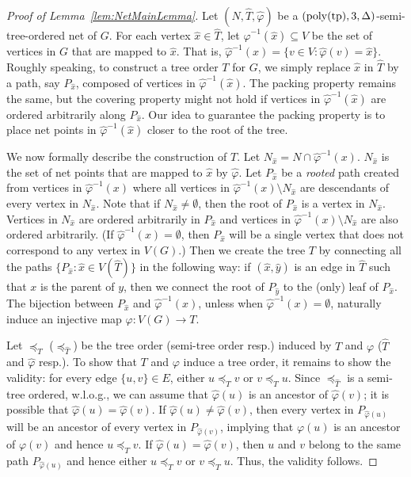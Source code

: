 \documentclass{article}
\newcommand{\tp}{{\rm tp}}
\newcommand{\poly}{\mathrm{poly}}
\begin{document}
\begin{proof}[Proof of Lemma~\ref{lem:NetMainLemma}] Let $(N,\hat{T},\hat{\varphi})$ be a $(\poly(\tp),3,\Delta)$-semi-tree-ordered net of $G$. For each vertex $\hat{x}\in \hat{T}$, let $\hat{\varphi}^{-1}(\hat{x})\subseteq V$ be the set of vertices in $G$ that are mapped to $\hat{x}$.  That is,  $\hat{\varphi}^{-1}(x) = \{v\in V: \hat{\varphi}(v) = \hat{x}\}$. Roughly speaking, to construct a tree order $T$ for $G$,  we simply replace $\hat{x}$ in $\hat{T}$ by a path, say $P_{\hat{x}}$, composed of vertices in  $\hat{\varphi}^{-1}(\hat{x})$. The packing property remains the same, but the covering property might not hold if vertices in  $\hat{\varphi}^{-1}(\hat{x})$ are ordered arbitrarily along $P_{\hat{x}}$. Our idea to guarantee the packing property is to place net points in $\hat{\varphi}^{-1}(\hat{x})$ closer to the root of the tree.


We now formally describe the construction of $T$. Let $N_{\hat{x}} = N\cap \hat{\varphi}^{-1}(x)$. $N_{\hat{x}}$ is the set of net points that are mapped to $\hat{x}$ by $\hat{\varphi}$. Let $P_{\hat{x}}$ be a \emph{rooted} path created from vertices in $\hat{\varphi}^{-1}(x)$ where all vertices in   $\hat{\varphi}^{-1}(x)\setminus N_{\hat{x}}$ are descendants of every vertex in $N_{\hat{x}}$. Note that if $N_{\hat{x}}\not=\emptyset$, then the root of $P_{\hat{x}}$ is a vertex in $N_{\hat{x}}$. Vertices in $N_{\hat{x}}$ are ordered arbitrarily in  $P_{\hat{x}}$ and vertices in $\hat{\varphi}^{-1}(x)\setminus N_{\hat{x}}$ are also ordered arbitrarily. (If $\hat{\varphi}^{-1}(x) = \emptyset$, then $P_{\hat{x}}$ will be a single vertex that does not correspond to any vertex in $V(G)$.) Then we create the tree $T$ by connecting all the paths $\{P_{\hat{x}}: \hat{x} \in V(\hat{T})\}$ in the following way: if $(\hat{x},\hat{y})$ is an edge in $\hat{T}$ such that $x$ is the parent of $y$, then we connect the root of $P_{\hat{y}}$ to the (only) leaf of $P_{\hat{x}}$. The bijection between $P_{\hat{x}}$ and $\hat{\varphi}^{-1}(x)$, unless when $\hat{\varphi}^{-1}(x) = \emptyset$, naturally induce an injective map $\varphi:V(G)\rightarrow T$. 

Let $\preceq_T$ ($\preceq_{\hat{T}}$)  be the tree order (semi-tree order resp.) induced by  $T$ and $\varphi$ ($\hat{T}$ and $\hat{\varphi}$ resp.). To show that $T$ and $\varphi$ induce a tree order, it remains to show the validity: for every edge $\{u,v\} \in E$, either $u \preceq_T v$  or $v\preceq_T u$. Since $\preceq_{\hat{T}}$  is a semi-tree ordered, w.l.o.g., we can assume that $\hat{\varphi}(u)$ is an ancestor of $\hat{\varphi}(v)$; it is possible that $\hat{\varphi}(u) = \hat{\varphi}(v)$.  If $\hat{\varphi}(u) \not=\hat{\varphi}(v)$, then every vertex in $P_{\hat{\varphi}(u)}$ will be an ancestor of every vertex in $P_{\hat{\varphi}(v)}$, implying that $\varphi(u)$ is an ancestor of $\varphi(v)$ and hence  $u \preceq_T v$. If $\hat{\varphi}(u) =\hat{\varphi}(v)$, then $u$ and $v$ belong to the same path $P_{\hat{\varphi}(u)}$ and hence either $u \preceq_T v$ or $v \preceq_T u$. Thus, the validity follows. 


\end{proof}
\end{document}
